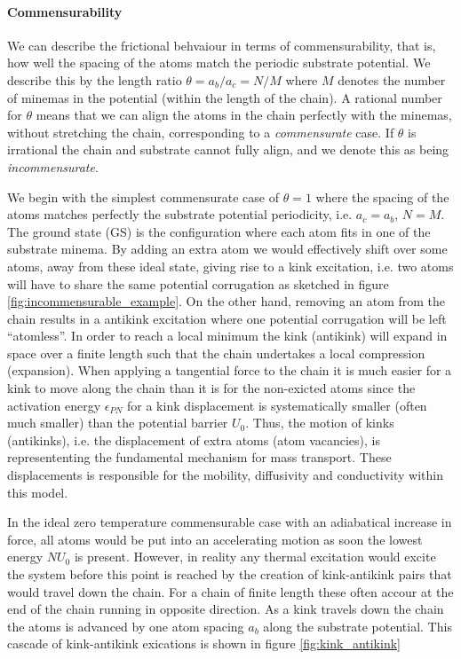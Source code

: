 \paragraph*{Commensurability} We can describe the frictional behvaiour in terms of commensurability, that is, how well the spacing of the atoms match the periodic substrate potential. We describe this by the length ratio $\theta = a_b / a_c = N / M$ where $M$ denotes the number of minemas in the potential (within the length of the chain). A rational number for $\theta$ means that we can align the atoms in the chain perfectly with the minemas, without stretching the chain, corresponding to a \textit{commensurate} case. If $\theta$ is irrational the chain and substrate cannot fully align, and we denote this as being \textit{incommensurate}.

We begin with the simplest commensurate case of $\theta = 1$ where the
spacing of the atoms matches perfectly the substrate potential periodicity, i.e.
$a_c = a_b$, $N = M$. The ground state (GS) is the configuration where each atom
fits in one of the substrate minema. By adding an extra atom we would effectively
shift over some atoms, away from these ideal state, giving rise to a kink excitation, i.e. two atoms will have to share the same potential corrugation as
sketched in figure \ref{fig:incommensurable_example}.  On the other hand, removing an atom from the chain results in a antikink excitation where one potential corrugation will be left ``atomless''. In order to reach a local minimum the kink
(antikink) will expand in space over a finite length such that the chain undertakes a local compression (expansion). When applying a tangential force to the
chain it is much easier for a kink to move along the chain than it is for the non-exicted atoms since the activation energy $\epsilon_{PN}$ for a kink displacement is systematically smaller (often much smaller) than the potential barrier $U_0$. Thus, the motion of kinks (antikinks), i.e. the displacement of extra atoms (atom vacancies), is represententing the fundamental mechanism for mass transport. These displacements is responsible for the mobility, diffusivity and conductivity within this model. 

In the ideal zero temperature commensurable case with an adiabatical increase in force, all atoms would be put into an accelerating motion as soon the lowest energy $NU_0$ is present. However, in reality any thermal excitation would excite the system before this point is reached by the creation of kink-antikink pairs that would travel down the chain. For a chain of finite length these often accour at the end of the chain running in opposite direction. As a kink travels down the chain the atoms is advanced by one atom spacing $a_b$ along the substrate potential. This cascade of kink-antikink exications is shown in figure \ref{fig:kink_antikink}

